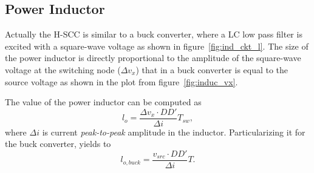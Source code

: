 \subsection{Power Inductor}

Actually the H-SCC is similar to a buck converter, where a LC low pass filter is excited with a square-wave voltage as shown in figure~\ref{fig:ind_ckt_l}. The size of the power inductor is directly proportional to the amplitude of the square-wave voltage at the switching node ($\Delta v_x$) that in a buck converter is equal to the source voltage  as shown in the plot from figure~\ref{fig:induc_vx}.

The value of the power inductor can be computed as
\begin{equation}
 l_{o}   = \frac{\Delta v_{x} \cdot DD'}{\Delta i} T_{sw},
\label{eq:gen_l}
\end{equation}
where $\Delta i$ is current \emph{peak-to-peak} amplitude in the inductor. Particularizing it for the buck converter, yields to
\begin{equation}
 l_{o,buck}  = \frac{v_{src} \cdot DD'}{\Delta i} T.
\label{eq:buck_l}
\end{equation}

